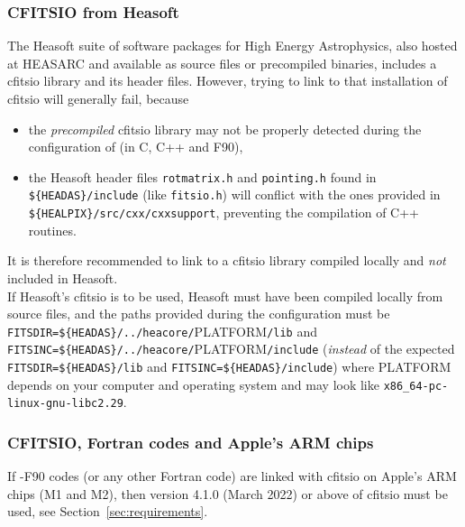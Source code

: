 \documentclass[12pt,twoside]{article}
\begin{document}
\subsubsection*{CFITSIO from Heasoft}
\label{install:heasoft}
%
The Heasoft suite of software packages for High Energy Astrophysics, 
also hosted at HEASARC and available as source files or precompiled binaries, 
includes a cfitsio library and its header files.
However, trying to link \healpix to that installation of cfitsio will generally fail, because
\begin{itemize}
\item the {\em precompiled} cfitsio library may not be properly detected during the configuration of 
\healpix (in C, C++ and F90),
\item the Heasoft header files 
\texttt{rotmatrix.h} and 
\texttt{pointing.h} found in 
\texttt{\$\{HEADAS\}/include} (like
\texttt{fitsio.h}) will conflict with the ones provided in 
\texttt{\$\{HEALPIX\}/src/cxx/cxxsupport},
preventing the compilation of \healpix C++ routines.
\end{itemize}
It is therefore recommended to link \healpix to a cfitsio library compiled 
locally and {\em not} included in Heasoft.\\
If Heasoft's cfitsio is to be used, 
Heasoft must have been compiled locally from source files,
and the paths provided during the \healpix configuration must be
\texttt{FITSDIR=\$\{HEADAS\}/../heacore/}PLATFORM\texttt{/lib} and
\texttt{FITSINC=\$\{HEADAS\}/../heacore/}PLATFORM\texttt{/include}
(\emph{instead} of the expected 
\texttt{FITSDIR=\$\{HEADAS\}/lib} and
\texttt{FITSINC=\$\{HEADAS\}/include})
where PLATFORM depends on your computer and operating system and may look like \texttt{x86\_64-pc-linux-gnu-libc2.29}.

\subsubsection*{CFITSIO, Fortran codes and Apple's ARM chips}
If \healpixns-F90  codes (or any other Fortran code) are linked with cfitsio on Apple's
ARM chips (M1 and M2), then version 4.1.0 (March 2022) or above of cfitsio must
be used, see Section~\ref{sec:requirements}.


\end{document}
